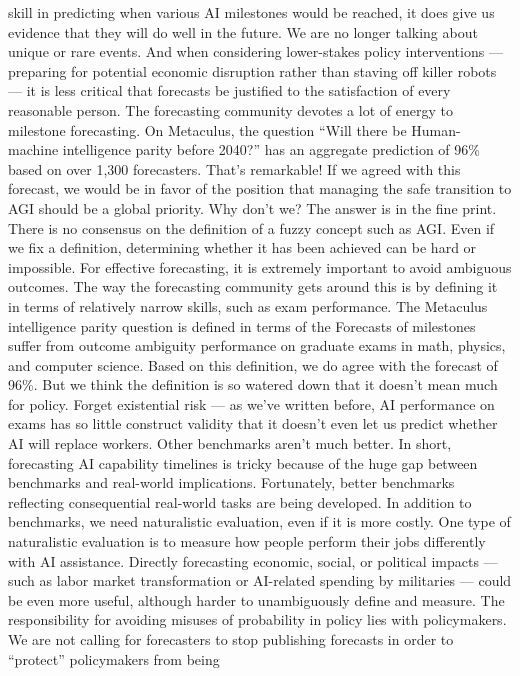 skill in predicting when various AI milestones would be reached, it
does give us evidence that they will do well in the future. We are no
longer talking about unique or rare events. And when considering
lower-stakes policy interventions — preparing for potential economic
disruption rather than staving off killer robots — it is less critical that
forecasts be justiﬁed to the satisfaction of every reasonable person.
The forecasting community devotes a lot of energy to milestone
forecasting. On Metaculus, the question “Will there be Human-
machine intelligence parity before 2040?” has an aggregate
prediction of 96\% based on over 1,300 forecasters. That’s
remarkable! If we agreed with this forecast, we would be in favor of
the position that managing the safe transition to AGI should be a
global priority. Why don’t we?
The answer is in the ﬁne print. There is no consensus on the
deﬁnition of a fuzzy concept such as AGI. Even if we ﬁx a deﬁnition,
determining whether it has been achieved can be hard or impossible.
For effective forecasting, it is extremely important to avoid
ambiguous outcomes. The way the forecasting community gets
around this is by deﬁning it in terms of relatively narrow skills, such
as exam performance.
The Metaculus intelligence parity question is deﬁned in terms of the
Forecasts of milestones suffer from outcome
ambiguity
performance on graduate exams in math, physics, and computer
science. Based on this deﬁnition, we do agree with the forecast of
96\%. But we think the deﬁnition is so watered down that it doesn’t
mean much for policy. Forget existential risk — as we’ve written
before, AI performance on exams has so little construct validity that it
doesn’t even let us predict whether AI will replace workers.
Other benchmarks aren’t much better. In short, forecasting AI
capability timelines is tricky because of the huge gap between
benchmarks and real-world implications. Fortunately, better
benchmarks reﬂecting consequential real-world tasks are being
developed. In addition to benchmarks, we need naturalistic
evaluation, even if it is more costly. One type of naturalistic
evaluation is to measure how people perform their jobs differently
with AI assistance. Directly forecasting economic, social, or political
impacts — such as labor market transformation or AI-related
spending by militaries — could be even more useful, although harder
to unambiguously deﬁne and measure.
The responsibility for avoiding misuses of probability in policy lies
with policymakers. We are not calling for forecasters to stop
publishing forecasts in order to “protect” policymakers from being
